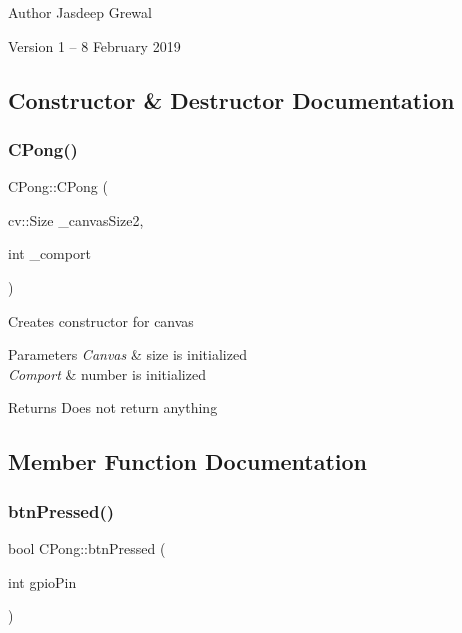 \begin{DoxyAuthor}{Author}
Jasdeep Grewal
\end{DoxyAuthor}
\begin{DoxyVersion}{Version}
1 -- 8 February 2019 
\end{DoxyVersion}


\subsection{Constructor \& Destructor Documentation}
\hypertarget{class_c_pong_a6eb8c1a5601f06350cc0c3d30fbc392a}{}\label{class_c_pong_a6eb8c1a5601f06350cc0c3d30fbc392a} 
\subsubsection{\texorpdfstring{C\+Pong()}{CPong()}}
{\footnotesize\ttfamily C\+Pong\+::\+C\+Pong (\begin{DoxyParamCaption}\item[{cv\+::\+Size}]{\+\_\+canvas\+Size2,  }\item[{int}]{\+\_\+comport }\end{DoxyParamCaption})}

Creates constructor for canvas


\begin{DoxyParams}{Parameters}
{\em Canvas} & size is initialized \\
\hline
{\em Comport} & number is initialized\\
\hline
\end{DoxyParams}
\begin{DoxyReturn}{Returns}
Does not return anything 
\end{DoxyReturn}


\subsection{Member Function Documentation}
\hypertarget{class_c_pong_a74d1c17870e642d1567833a9f40c870e}{}\label{class_c_pong_a74d1c17870e642d1567833a9f40c870e} 
\subsubsection{\texorpdfstring{btn\+Pressed()}{btnPressed()}}
{\footnotesize\ttfamily bool C\+Pong\+::btn\+Pressed (\begin{DoxyParamCaption}\item[{int}]{gpio\+Pin }\end{DoxyParamCaption})}

